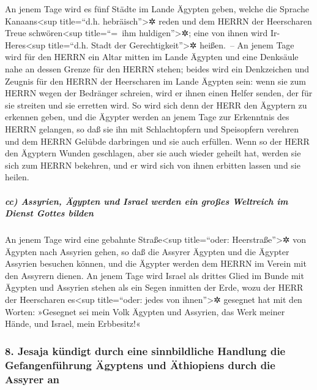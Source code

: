 An jenem Tage wird es fünf Städte im Lande Ägypten geben,
welche die Sprache Kanaans\textless sup title=``d.h.
hebräisch''\textgreater✲ reden und dem HERRN der Heerscharen Treue
schwören\textless sup title=``=~ihm huldigen''\textgreater✲; eine von
ihnen wird Ir-Heres\textless sup title=``d.h. Stadt der
Gerechtigkeit''\textgreater✲ heißen.~-- An jenem Tage
wird für den HERRN ein Altar mitten im Lande Ägypten und eine Denksäule
nahe an dessen Grenze für den HERRN stehen; beides wird
ein Denkzeichen und Zeugnis für den HERRN der Heerscharen im Lande
Ägypten sein: wenn sie zum HERRN wegen der Bedränger schreien, wird er
ihnen einen Helfer senden, der für sie streiten und sie erretten wird.
So wird sich denn der HERR den Ägyptern zu erkennen
geben, und die Ägypter werden an jenem Tage zur Erkenntnis des HERRN
gelangen, so daß sie ihn mit Schlachtopfern und Speisopfern verehren und
dem HERRN Gelübde darbringen und sie auch erfüllen. Wenn
so der HERR den Ägyptern Wunden geschlagen, aber sie auch wieder geheilt
hat, werden sie sich zum HERRN bekehren, und er wird sich von ihnen
erbitten lassen und sie heilen.

\hypertarget{cc-assyrien-uxe4gypten-und-israel-werden-ein-grouxdfes-weltreich-im-dienst-gottes-bilden}{%
\subparagraph{cc) Assyrien, Ägypten und Israel werden ein großes
Weltreich im Dienst Gottes
bilden}\label{cc-assyrien-uxe4gypten-und-israel-werden-ein-grouxdfes-weltreich-im-dienst-gottes-bilden}}

An jenem Tage wird eine gebahnte Straße\textless sup
title=``oder: Heerstraße''\textgreater✲ von Ägypten nach Assyrien gehen,
so daß die Assyrer Ägypten und die Ägypter Assyrien besuchen können, und
die Ägypter werden dem HERRN im Verein mit den Assyrern dienen.
An jenem Tage wird Israel als drittes Glied im Bunde mit
Ägypten und Assyrien stehen als ein Segen inmitten der Erde,
wozu der HERR der Heerscharen es\textless sup
title=``oder: jedes von ihnen''\textgreater✲ gesegnet hat mit den
Worten: »Gesegnet sei mein Volk Ägypten und Assyrien, das Werk meiner
Hände, und Israel, mein Erbbesitz!«

\hypertarget{jesaja-kuxfcndigt-durch-eine-sinnbildliche-handlung-die-gefangenfuxfchrung-uxe4gyptens-und-uxe4thiopiens-durch-die-assyrer-an}{%
\subsubsection{8. Jesaja kündigt durch eine sinnbildliche Handlung die
Gefangenführung Ägyptens und Äthiopiens durch die Assyrer
an}\label{jesaja-kuxfcndigt-durch-eine-sinnbildliche-handlung-die-gefangenfuxfchrung-uxe4gyptens-und-uxe4thiopiens-durch-die-assyrer-an}}

